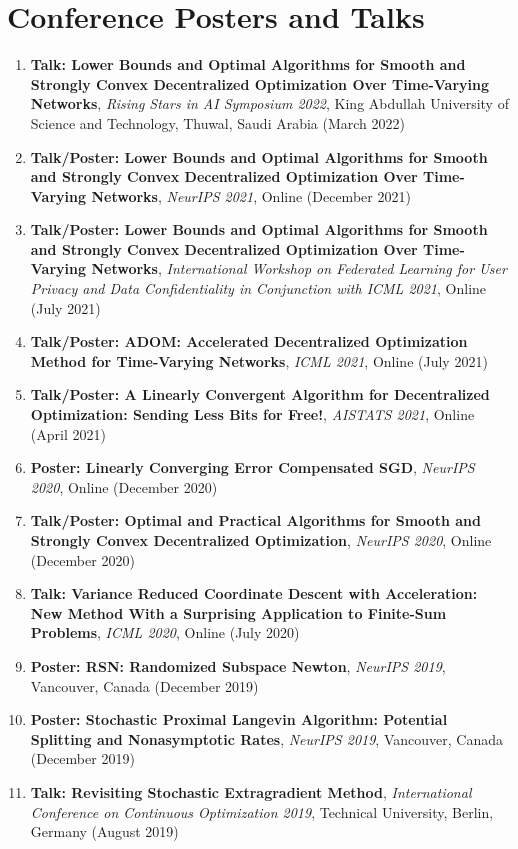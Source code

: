 \section{Conference Posters and Talks}
\begin{enumerate}
\item {\bf Talk: Lower Bounds and Optimal Algorithms for Smooth and Strongly Convex Decentralized Optimization Over Time-Varying Networks}, {\em Rising Stars in AI Symposium 2022}, King Abdullah University of Science and Technology, Thuwal, Saudi Arabia (March 2022)
\item {\bf Talk/Poster: Lower Bounds and Optimal Algorithms for Smooth and Strongly Convex Decentralized Optimization Over Time-Varying Networks}, {\em NeurIPS 2021}, Online (December 2021)
\item {\bf Talk/Poster: Lower Bounds and Optimal Algorithms for Smooth and Strongly Convex Decentralized Optimization Over Time-Varying Networks}, {\em International Workshop on Federated Learning for User Privacy and Data Confidentiality in Conjunction with ICML 2021}, Online (July 2021)
\item {\bf Talk/Poster: ADOM: Accelerated Decentralized Optimization Method for Time-Varying Networks}, {\em ICML 2021}, Online (July 2021)
\item {\bf Talk/Poster: A Linearly Convergent Algorithm for Decentralized Optimization: Sending Less Bits for Free!}, {\em AISTATS 2021}, Online (April 2021)
\item {\bf Poster: Linearly Converging Error Compensated SGD}, {\em NeurIPS 2020}, Online (December 2020)
\item {\bf Talk/Poster: Optimal and Practical Algorithms for Smooth and Strongly Convex Decentralized Optimization}, {\em NeurIPS 2020}, Online (December 2020)
\item {\bf Talk: Variance Reduced Coordinate Descent with Acceleration: New Method With a Surprising Application to Finite-Sum Problems}, {\em ICML 2020}, Online (July 2020)
\item {\bf Poster: RSN: Randomized Subspace Newton}, {\em NeurIPS 2019}, Vancouver, Canada (December 2019)
\item {\bf Poster: Stochastic Proximal Langevin Algorithm: Potential Splitting and Nonasymptotic Rates}, {\em NeurIPS 2019}, Vancouver, Canada (December 2019)
\item {\bf Talk: Revisiting Stochastic Extragradient Method}, {\em International Conference on Continuous Optimization 2019}, Technical University, Berlin, Germany (August 2019)

\end{enumerate}
